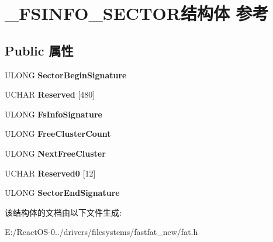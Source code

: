 \hypertarget{struct___f_s_i_n_f_o___s_e_c_t_o_r}{}\section{\+\_\+\+F\+S\+I\+N\+F\+O\+\_\+\+S\+E\+C\+T\+O\+R结构体 参考}
\label{struct___f_s_i_n_f_o___s_e_c_t_o_r}
\subsection*{Public 属性}
\begin{DoxyCompactItemize}
\item 
\mbox{\label{struct___f_s_i_n_f_o___s_e_c_t_o_r_aef4baf340eced546f71ac5f6bb41e779}} 
U\+L\+O\+NG {\bfseries Sector\+Begin\+Signature}
\item 
\mbox{\label{struct___f_s_i_n_f_o___s_e_c_t_o_r_a51f0734da9518382958139f382a16888}} 
U\+C\+H\+AR {\bfseries Reserved} \mbox{[}480\mbox{]}
\item 
\mbox{\label{struct___f_s_i_n_f_o___s_e_c_t_o_r_a7489c0ef59e001c31f226cfbaaaa546d}} 
U\+L\+O\+NG {\bfseries Fs\+Info\+Signature}
\item 
\mbox{\label{struct___f_s_i_n_f_o___s_e_c_t_o_r_ad77313ec2ae451b0639640c4f1af9800}} 
U\+L\+O\+NG {\bfseries Free\+Cluster\+Count}
\item 
\mbox{\label{struct___f_s_i_n_f_o___s_e_c_t_o_r_a8d3f3cdf3d751684efe56b089c2db415}} 
U\+L\+O\+NG {\bfseries Next\+Free\+Cluster}
\item 
\mbox{\label{struct___f_s_i_n_f_o___s_e_c_t_o_r_ae45a55840bf779f1b393049f0661992d}} 
U\+C\+H\+AR {\bfseries Reserved0} \mbox{[}12\mbox{]}
\item 
\mbox{\label{struct___f_s_i_n_f_o___s_e_c_t_o_r_a7b5ffe2353d9accc57dac9f62e52010d}} 
U\+L\+O\+NG {\bfseries Sector\+End\+Signature}
\end{DoxyCompactItemize}


该结构体的文档由以下文件生成\+:\begin{DoxyCompactItemize}
\item 
E\+:/\+React\+O\+S-\/0../drivers/filesystems/fastfat\+\_\+new/fat.\+h\end{DoxyCompactItemize}
